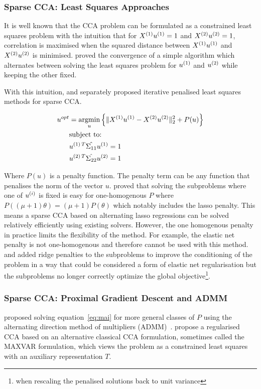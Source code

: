 \subsubsection{Sparse CCA: Least Squares Approaches}

It is well known that the CCA problem can be formulated as a constrained least squares problem with the intuition that
for \(X^{(1)} u^{(1)}=1\) and \(X^{(2)} u^{(2)}=1\), correlation is maximised when the squared distance
between \(X^{(1)} u^{(1)}\) and \(X^{(2)} u^{(2)}\) is minimised. \citep{golub1995canonical} proved the
convergence of a simple algorithm which alternates between solving the least squares problem for \(u^{(1)}\) and
\(u^{(2)}\) while keeping the other fixed.

With this intuition, \cite{wilms2015sparse} and \cite{mai2019iterative} separately proposed iterative penalised least
squares methods for sparse CCA\@.

\begin{align}
    \label{eq:mai}
    u^{opt} &= \underset{u}{\mathrm{argmin}} \left\{ \|X^{(1)}u^{(1)} - X^{(2)}u^{(2)}\|_2^2 + P(u) \right\} \\
    &\text{subject to:} \notag \\
    &u^{(1)\,T} \hat{\Sigma_{11}} u^{(1)}=1 \notag \\
    &u^{(2)\,T} \hat{\Sigma_{22}} u^{(2)}=1 \notag
\end{align}

Where \(P(u)\) is a penalty function.
The penalty term can be any function that penalises the norm of the vector \(u\).
\citep{mai2019iterative} proved that solving the subproblems where one of $u^{(i)}$ is fixed is easy for one-homogenous $P$ where
\( P((\mu + 1)\theta) = (\mu + 1)P(\theta) \) which notably includes the lasso penalty.
This means a sparse CCA based
on alternating lasso regressions can be solved relatively efficiently using existing solvers.
However, the one homogenous penalty in practice limits the flexibility of the method.
For example, the elastic net penalty is not one-homogenous and therefore cannot be used with this method.
\citet{6556581} and \cite{Mullins2021} added ridge penalties to the subproblems to improve the conditioning of the problem in a way that could be considered a form of elastic net regularisation but the subproblems no longer correctly optimize the global objective\footnote{when rescaling the penalised solutions back to unit variance}.

\subsubsection{Sparse CCA: Proximal Gradient Descent and ADMM}
\citet{kanatsoulis2018structured} proposed solving equation~\ref{eq:mai} for more general classes of $P$ using the alternating direction method of multipliers (ADMM)~\citep{boyd2011distributed}.
\cite{fu2017scalable} propose a regularised CCA based on an alternative classical CCA formulation, sometimes called the MAXVAR formulation, which views the problem as a constrained least squares with an auxiliary representation $T$\citep{carroll1968generalization,kettenring1971canonical}.

